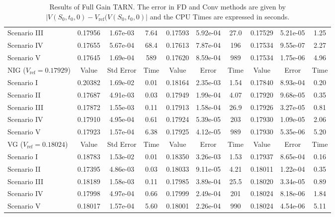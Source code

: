 \begin{table}
\begin{tabular}{l||c|c|c||c|c|c||c|c|c}
    Scenario III & 0.17956 & 1.67e-03 & 7.64 & 0.17593 & 5.92e-04 & 27.0 & 0.17529 & 5.21e-05 & 1.25 \\
    Scenario IV  & 0.17655 & 5.67e-04 & 68.4 & 0.17613 & 7.87e-04 & 196 & 0.17534 & 9.55e-07 & 2.27 \\
    Scenario V   & 0.17645 & 1.69e-04 & 589  & 0.17620 & 8.59e-04 & 989 & 0.17534 & 1.75e-06 & 4.96 \\
         \midrule
      NIG ($V_\text{ref}=0.17929$) & Value & Std Error  & Time & Value & Error & Time & Value & Error & Time \\
      \midrule
    Scenario I   & 0.20382 & 1.69e-02 & 0.01 & 0.18164 & 2.35e-03 & 1.54 & 0.17840 & 8.93e-04 & 0.20 \\
    Scenario II  & 0.17687 & 4.91e-03 & 0.03 & 0.17949 & 1.99e-04 & 4.07 & 0.17920 & 9.68e-05 & 0.35 \\
    Scenario III & 0.17872 & 1.55e-03 & 0.11 & 0.17913 & 1.58e-04 & 26.9 & 0.17926 & 3.27e-05 & 0.81 \\
    Scenario IV  & 0.17910 & 4.95e-04 & 0.61 & 0.17924 & 5.39e-05 & 203 & 0.17930 & 1.09e-05 & 2.06 \\
    Scenario V   & 0.17923 & 1.57e-04 & 6.38 & 0.17925 & 4.12e-05 & 989 & 0.17930 & 5.35e-06 & 5.20 \\
         \midrule
      VG ($V_\text{ref}=0.18024$) & Value & Std Error  & Time & Value & Error & Time & Value & Error & Time \\
      \midrule
    Scenario I   & 0.18783 & 1.53e-02 & 0.01 & 0.18350 & 3.26e-03 & 1.53 & 0.17937 & 8.65e-04 & 0.16 \\
    Scenario II  & 0.17395 & 4.86e-03 & 0.03 & 0.18033 & 9.11e-05 & 4.21 & 0.18011 & 1.22e-04 & 0.35 \\
    Scenario III & 0.18189 & 1.58e-03 & 0.11 & 0.17985 & 3.89e-04 & 25.5 & 0.18020 & 3.34e-05 & 0.89 \\
    Scenario IV  & 0.17998 & 4.97e-04 & 0.66 & 0.17999 & 2.49e-04 & 201 & 0.18024 & 8.18e-06 & 1.84 \\
    Scenario V   & 0.18017 & 1.57e-04 & 5.60 & 0.18001 & 2.26e-04 & 990 & 0.18024 & 4.54e-06 & 5.11 \\
    \bottomrule
  \end{tabular}
  \vspace{5pt}
  \caption{\label{tab:res_fg} Results of Full Gain TARN. The error in FD and Conv methods are given by $|V(S_0,t_0,0)-V_\text{ref}(V(S_0,t_0,0)|$ and the CPU Times are expressed in seconds.}
\end{table}

